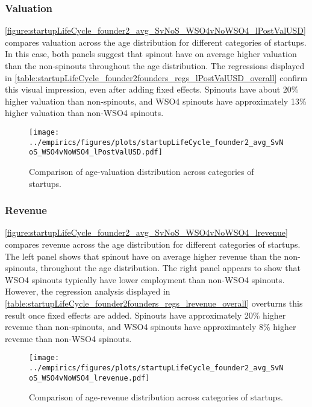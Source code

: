 \documentclass[12pt,english]{article}
\theoremstyle{remark}
\begin{document}
\subsubsection{Valuation}

\autoref{figure:startupLifeCycle_founder2_avg_SvNoS_WSO4vNoWSO4_lPostValUSD} compares valuation across the age distribution for different categories of startups. In this case, both panels suggest that spinout have on average higher valuation than the non-spinouts throughout the age distribution. The regressions displayed in \autoref{table:startupLifeCycle_founder2founders_regs_lPostValUSD_overall} confirm this visual impression, even after adding fixed effects. Spinouts have about 20\% higher valuation than non-spinouts, and WSO4 spinouts have approximately 13\% higher valuation than non-WSO4 spinouts.

\begin{figure}[]
	\centering
	\texttt{[image: ../empirics/figures/plots/startupLifeCycle\_founder2\_avg\_SvNoS\_WSO4vNoWSO4\_lPostValUSD.pdf]}
	\caption{Comparison of age-valuation distribution across categories of startups.}
	\label{figure:startupLifeCycle_founder2_avg_SvNoS_WSO4vNoWSO4_lPostValUSD}
\end{figure}

\subsubsection{Revenue}

\autoref{figure:startupLifeCycle_founder2_avg_SvNoS_WSO4vNoWSO4_lrevenue} compares revenue across the age distribution for different categories of startups. The left panel shows that spinout have on average higher revenue than the non-spinouts, throughout the age distribution. The right panel appears to show that WSO4 spinouts typically have lower employment than non-WSO4 spinouts. However, the regression analysis displayed in \autoref{table:startupLifeCycle_founder2founders_regs_lrevenue_overall} overturns this result once fixed effects are added. Spinouts have approximately 20\% higher revenue than non-spinouts, and WSO4 spinouts have approximately 8\% higher revenue than non-WSO4 spinouts.

\begin{figure}[]
	\centering
	\texttt{[image: ../empirics/figures/plots/startupLifeCycle\_founder2\_avg\_SvNoS\_WSO4vNoWSO4\_lrevenue.pdf]}
	\caption{Comparison of age-revenue distribution across categories of startups.}
	\label{figure:startupLifeCycle_founder2_avg_SvNoS_WSO4vNoWSO4_lrevenue}
\end{figure}
\end{document}
